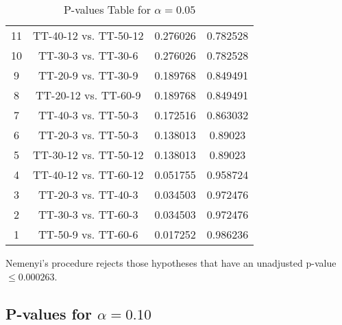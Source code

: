\documentclass[a4paper,10pt]{article}
\begin{document}
\begin{landscape}
\begin{table}[!htp]
\begin{tabular}{cccc}
11&TT-40-12 vs. TT-50-12&0.276026&0.782528\\
10&TT-30-3 vs. TT-30-6&0.276026&0.782528\\
9&TT-20-9 vs. TT-30-9&0.189768&0.849491\\
8&TT-20-12 vs. TT-60-9&0.189768&0.849491\\
7&TT-40-3 vs. TT-50-3&0.172516&0.863032\\
6&TT-20-3 vs. TT-50-3&0.138013&0.89023\\
5&TT-30-12 vs. TT-50-12&0.138013&0.89023\\
4&TT-40-12 vs. TT-60-12&0.051755&0.958724\\
3&TT-20-3 vs. TT-40-3&0.034503&0.972476\\
2&TT-30-3 vs. TT-60-3&0.034503&0.972476\\
1&TT-50-9 vs. TT-60-6&0.017252&0.986236\\
\hline
\end{tabular}
\caption{P-values Table for $\alpha=0.05$}
\end{table}Nemenyi's procedure rejects those hypotheses that have an unadjusted p-value $\le0.000263$.

\pagebreak

\subsection{P-values for $\alpha=0.10$}


\end{landscape}
\end{document}
